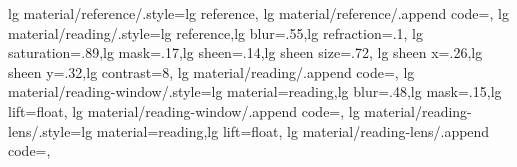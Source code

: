 {  lg material/reference/.style={lg reference},
  lg material/reference/.append code={\def\lg@materialpreset{reference}},
  lg material/reading/.style={lg reference,lg blur=.55,lg refraction=.1,
    lg saturation=.89,lg mask=.17,lg sheen=.14,lg sheen size=.72,
    lg sheen x=.26,lg sheen y=.32,lg contrast=8},
  lg material/reading/.append code={\def\lg@opticsprofile{reading}\def\lg@materialpreset{reading}},
  lg material/reading-window/.style={lg material=reading,lg blur=.48,lg mask=.15,lg lift=float},
  lg material/reading-window/.append code={\def\lg@materialpreset{reading-window}\lg@frosttext},
  lg material/reading-lens/.style={lg material=reading,lg lift=float},
  lg material/reading-lens/.append code={\def\lg@opticsprofile{reading-lens}\def\lg@materialpreset{reading-lens}},
}
\endinput
